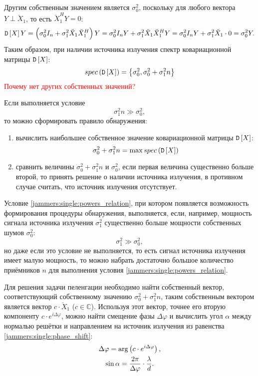 Другим собственным значением является $\sigma_0^2$, поскольку для любого вектора $Y \perp \breve{X}_1$, то есть $\breve{X}_1^H Y = 0$:
\[
    \mathtt{D} \left [ X \right ] Y
    = \left ( \sigma_0^2 I_n + \sigma_1^2 \breve{X}_1 \breve{X}_1^H \right ) Y
    = \sigma_0^2 I_n Y + \sigma_1^2 \breve{X}_1 \breve{X}_1^H Y
    = \sigma_0^2 I_n Y + \sigma_1^2 \breve{X}_1 \cdot 0
    = \sigma_0^2 Y .
\]
Таким образом, при наличии источника излучения спектр ковариационной матрицы $\mathtt{D} \left [ X \right ]$:
\[
    spec \left ( \mathtt{D} \left [ X \right ] \right ) = \left \{ \sigma_0^2, \sigma_0^2 + \sigma_1^2 n \right \}
\]
\textcolor{red}{Почему нет других собственных значений?}

Если выполняется условие
\begin{equation}
    \label{jammers:single:powers_relation}
    \sigma_1^2 n \gg \sigma_0^2 ,
\end{equation}
то можно сформировать правило обнаружения:
\begin{enumerate}
    \item вычислить наибольшее собственное значение ковариационной матрицы $\mathtt{D} \left [ X \right ]$:
    \[
        \sigma_0^2 + \sigma_1^2 n = \max spec \left ( \mathtt{D} \left [ X \right ] \right )
    \]
    \item сравнить величины $\sigma_0^2 + \sigma_1^2 n$ и $\sigma_0^2$, если первая величина существенно больше второй, то принять решение о наличии источника
    излучения, в противном случае считать, что источник излучения отсутствует.
\end{enumerate}

Условие \eqref{jammers:single:powers_relation}, при котором появляется возможность формирования процедуры обнаружения, выполняется, если, например, мощность
сигнала источника излучения $\sigma_1^2$ существенно больше мощности собственных шумов $\sigma_0^2$:
\[
    \sigma_1^2 \gg \sigma_0^2 ,
\]
но даже если это условие не выполняется, то есть сигнал источника излучения имеет малую мощность, то можно набрать достаточно большое количество приёмников $n$
для выполнения условия \eqref{jammers:single:powers_relation}.

Для решения задачи пеленгации необходимо найти собственный вектор, соответствующий собственному значению $\sigma_0^2 + \sigma_1^2 n$, таким собственным вектором
является вектор $c \cdot \breve{X}_1$ ($c \in \mathbb{C}$). Используя этот вектор, точнее его вторую компоненту $c \cdot e^{i \Delta \varphi}$, можно найти смещение фазы
$\Delta \varphi$ и вычислить угол $\alpha$ между нормалью решётки и направлением на источник излучения из равенства \eqref{jammers:single:phase_shift}:
\begin{gather}
    \Delta \varphi = \arg \left ( c \cdot e^{i \Delta \varphi} \right ), \notag \\
    \sin \alpha = \frac{2 \pi}{\Delta \varphi} \cdot \frac{\lambda}{d} \label{jammers:single:angle}.
\end{gather}


